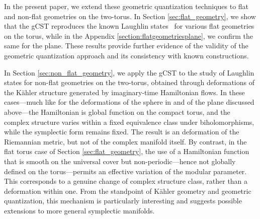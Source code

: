 \documentclass[a4paper,11pt]{article}
\begin{document}
In the present paper, we extend these geometric quantization techniques to flat and non-flat geometries on the two-torus. In Section \ref{sec:flat_geometry}, we show that the gCST reproduces the known Laughlin states~\cite{Haldane-Rezayi, Murayama, Johri.Papic.Schmitteckert.Bhatt.Haldane2016} for various flat geometries on the torus, while in the Appendix \ref{section:flatgeometriesplane}, we confirm the same for the plane. These results provide further evidence of the validity of the geometric quantization approach and its consistency with known constructions. 


In Section \ref{sec:non_flat_geometry}, we apply the gCST to the study of Laughlin states for non-flat geometries on the two-torus, obtained through deformations of the Kähler structure generated by imaginary-time Hamiltonian flows. In these cases—much like for the deformations of the sphere in \cite{matos:mera:mourao:mourao:nunes:2023} and of the plane discussed above—the Hamiltonian is global function on the compact torus, and the complex structure varies within a fixed equivalence class under biholomorphisms, while the symplectic form remains fixed. The result is an deformation of the Riemannian metric, but not of the complex manifold itself. By contrast, in the flat torus case of Section \ref{sec:flat_geometry}, the use of a Hamiltonian function that is smooth on the universal cover but non-periodic—hence not globally defined on the torus—permits an effective variation of the modular parameter. This corresponds to a genuine change of complex structure class, rather than a  deformation within one. From the standpoint of Kähler geometry and geometric quantization, this mechanism is particularly interesting and suggests possible extensions to more general symplectic manifolds.

\end{document}
